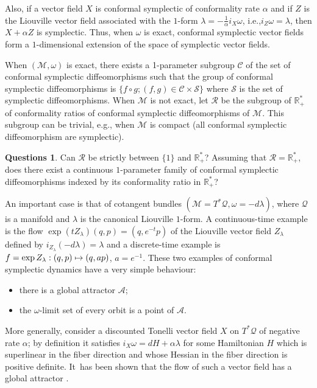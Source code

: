 \documentclass[11pt]{article}
\newcommand{\ie}{i.e.,\xspace}
\newcommand{\eg}{e.g.,\xspace}
\numberwithin{equation}{section}
\numberwithin{figure}{section}
\numberwithin{table}{section}
\def\mto{\mathchoice{\longmapsto}{\mapsto}{\mapsto}{\mapsto}}
\theoremstyle{definition}
\newtheorem*{questions*}{Questions}
\def\R{\mathbb{R}}
\def\cA{{\mathcal A}}
\def\cC{{\mathcal C}}
\def\cM{{\mathcal M}}
\def\cQ{{\mathcal Q}}
\def\cR{{\mathcal R}}
\def\cS{{\mathcal S}}
\begin{document}
Also, if a vector field $X$ is conformal symplectic of conformality rate $\alpha$ and if $Z$ is the Liouville vector field associated with the $1$-form $\lambda= - \frac{1}{\alpha}i_X\omega$, \ie $i_Z\omega = \lambda$, then $X+\alpha Z$ is symplectic. Thus, when $\omega$ is exact, conformal symplectic vector fields form a $1$-dimensional extension of the space of symplectic vector fields.

When $(\cM, \omega)$ is exact, there exists a 1-parameter subgroup $\cC$ of the set of conformal symplectic diffeomorphisms such that the group of conformal symplectic diffeomorphisms is $\{f\circ g; (f, g)\in \cC\times\cS\}$ where $\cS$ is the set of symplectic diffeomorphisms. When $\cM$ is not exact, let $\cR$ be the subgroup of $\R_+^*$ of conformality ratios of conformal symplectic diffeomorphisms of $\cM$. This subgroup can be trivial, \eg when $\cM$ is compact (all conformal symplectic diffeomorphism are symplectic).

\begin{questions*}
Can $\cR$ be strictly between $\{1\}$ and $\R^*_+$? Assuming that $\cR=\R^*_+$, does there exist a continuous $1$-para\-meter family of conformal symplectic diffeomorphisms indexed by its conformality ratio in $\R^*_+$?
\end{questions*}

An important case is that of cotangent bundles $(\cM = T^*\cQ, \omega=-d\lambda)$, where $\cQ$ is a manifold and $\lambda$ is the canonical Liouville $1$-form. A continuous-time example is the flow $\exp(tZ_\lambda)(q, p)=(q, e^{-t}p)$ of the Liouville vector field $Z_\lambda$ defined by $i_{Z_\lambda}(-d\lambda)=\lambda$ and
a discrete-time example is $f = \exp Z_\lambda: (q, p) \mto (q, a p)$, $a=e^{-1}$. These two examples of conformal symplectic dynamics have a very simple behaviour:
\begin{itemize}
\item there is a global attractor $\cA$;
\item the $\omega$-limit set of every orbit is a point of $\cA$.
\end{itemize}
More generally, consider a discounted Tonelli vector field $X$ on $T^*\cQ$ of negative rate $\alpha$; by definition it satisfies $i_X\omega = dH + \alpha \lambda$ for some Hamiltonian $H$ which is superlinear in the fiber direction and whose Hessian in the fiber direction is positive definite. It~has been shown that the flow of such a vector field has a global attractor \cite{MarSor2017}.
\end{document}
